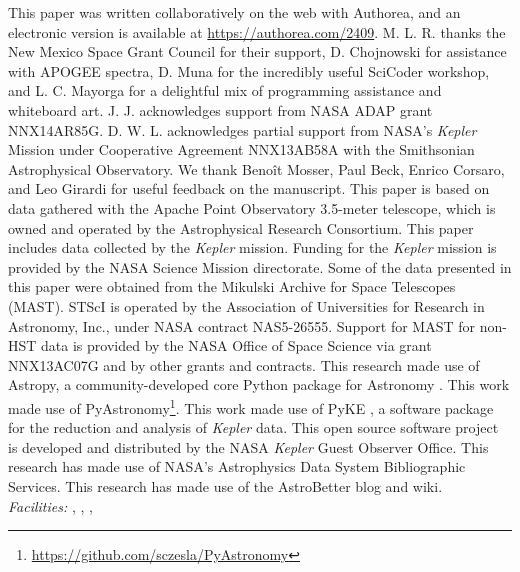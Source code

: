 \acknowledgments
This paper was written collaboratively on the web with Authorea, and an electronic version is available at \url{https://authorea.com/2409}. M. L. R. thanks the New Mexico Space Grant Council for their support, D. Chojnowski for assistance with APOGEE spectra, D. Muna for the incredibly useful SciCoder workshop, and L. C. Mayorga for a delightful mix of programming assistance and whiteboard art. J. J. acknowledges support from NASA ADAP grant NNX14AR85G. D. W. L. acknowledges partial support from NASA's \emph{Kepler} Mission under Cooperative Agreement NNX13AB58A with the Smithsonian Astrophysical Observatory. We thank Beno{\^i}t Mosser, Paul Beck, Enrico Corsaro, and Leo Girardi for useful feedback on the manuscript. This paper is based on data gathered with the Apache Point Observatory 3.5-meter telescope, which is owned and operated by the Astrophysical Research Consortium. This paper includes data collected by the \emph{Kepler} mission. Funding for the \emph{Kepler} mission is provided by the NASA Science Mission directorate. Some of the data presented in this paper were obtained from the Mikulski Archive for Space Telescopes (MAST). STScI is operated by the Association of Universities for Research in Astronomy, Inc., under NASA contract NAS5-26555. Support for MAST for non-HST data is provided by the NASA Office of Space Science via grant NNX13AC07G and by other grants and contracts. This research made use of Astropy, a community-developed core Python package for Astronomy \citep{astropy}. This work made use of PyAstronomy\footnote{\url{https://github.com/sczesla/PyAstronomy}}. This work made use of PyKE \citep{pyke}, a software package for the reduction and analysis of \emph{Kepler} data. This open source software project is developed and distributed by the NASA \emph{Kepler} Guest Observer Office. This research has made use of NASA's Astrophysics Data System Bibliographic Services. This research has made use of the AstroBetter blog and wiki.
\\

{\it Facilities:} , , , 

